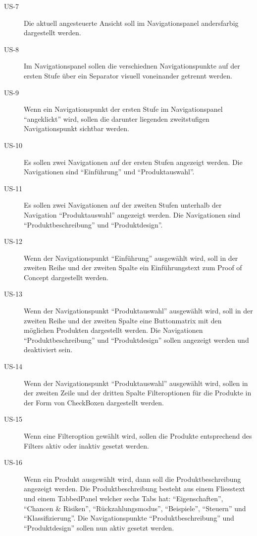 \begin{description}
\item[US-7\label{itm:US-7}]
Die aktuell angesteuerte Ansicht soll im Navigationspanel andersfarbig
dargestellt werden.

\item[US-8\label{itm:US-8}]
Im Navigationspanel sollen die verschiednen Navigationspunkte auf der ersten
Stufe über ein Separator visuell voneinander getrennt werden.

\item[US-9\label{itm:US-9}]
Wenn ein Navigationspunkt der ersten Stufe im Navigationspanel ``angeklickt''
wird, sollen die darunter liegenden zweitstufigen Navigationspunkt sichtbar
werden.

\item[US-10\label{itm:US-10}]
Es sollen zwei Navigationen auf der ersten Stufen angezeigt werden. Die
Navigationen sind ``Einführung'' und ``Produktauswahl''.

\item[US-11\label{itm:US-11}]
Es sollen zwei Navigationen auf der zweiten Stufen unterhalb der Navigation
``Produktauswahl'' angezeigt werden. Die Navigationen sind
``Produktbeschreibung'' und ``Produktdesign''.

\item[US-12]
Wenn der Navigationspunkt ``Einführung'' ausgewählt wird, soll in der zweiten
Reihe und der zweiten Spalte ein Einführungstext zum Proof of Concept
dargestellt werden.

\item[US-13]
Wenn der Navigationspunkt ``Produktauswahl'' ausgewählt wird, soll in der
zweiten Reihe und der zweiten Spalte eine Buttonmatrix mit den möglichen
Produkten dargestellt werden. Die Navigationen ``Produktbeschreibung'' und
``Produktdesign'' sollen angezeigt werden und deaktiviert sein.

\item[US-14]
Wenn der Navigationspunkt ``Produktauswahl'' ausgewählt wird, sollen in der
zweiten Zeile und der dritten Spalte Filteroptionen für die Produkte in der Form
von CheckBoxen dargestellt werden.

\item[US-15]
Wenn eine Filteroption gewählt wird, sollen die Produkte entsprechend des
Filters aktiv oder inaktiv gesetzt werden.

\item[US-16]
Wenn ein Produkt ausgewählt wird, dann soll die Produktbeschreibung angezeigt
werden. Die Produktbeschreibung besteht aus einem Fliesstext und
einem TabbedPanel welcher sechs Tabs hat: ``Eigenschaften'', ``Chancen \&
Risiken'', ``Rückzahlungsmodus'', ``Beispiele'', ``Steuern'' und
``Klassifizierung''. Die Navigationspunkte ``Produktbeschreibung'' und
``Produktdesign'' sollen nun aktiv gesetzt werden.


\end{description}
